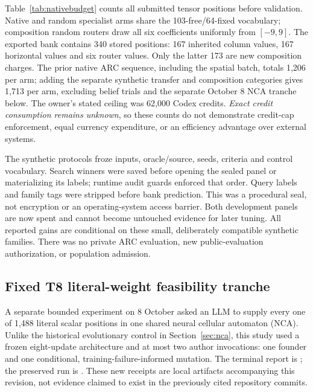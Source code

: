 \documentclass[11pt]{article}
\begin{document}
Table~\ref{tab:nativebudget} counts all submitted tensor positions before validation. Native and
random specialist arms share the 103-free/64-fixed vocabulary; composition random routers draw
all six coefficients uniformly from $[-9,9]$. The exported bank contains 340 stored positions:
167 inherited column values, 167 horizontal values and six router values. Only the latter 173
are new composition charges. The prior native ARC sequence, including the spatial batch, totals
1{,}206 per arm; adding the separate synthetic transfer and composition categories gives 1{,}713
per arm, excluding belief trials and the separate October 8 NCA tranche below. The owner's stated
ceiling was 62{,}000 Codex credits.
\emph{Exact credit consumption remains unknown}, so these counts do not demonstrate credit-cap
enforcement, equal currency expenditure, or an efficiency advantage over external systems.

The synthetic protocols froze inputs, oracle/source, seeds, criteria and control vocabulary.
Search winners were saved before opening the sealed panel or materializing its labels; runtime
audit guards enforced that order. Query labels and family tags were stripped before bank
prediction. This was a procedural seal, not encryption or an operating-system access barrier.
Both development panels are now spent and cannot become untouched evidence for later tuning.
All reported gains are conditional on these small, deliberately compatible synthetic families.
There was no private ARC evaluation, new public-evaluation authorization, or population admission.

\subsection{Fixed T8 literal-weight feasibility tranche}\label{sec:ncatranche}
A separate bounded experiment on 8 October asked an LLM to supply every one of
1{,}488 literal scalar positions in one shared neural cellular automaton (NCA).
Unlike the historical evolutionary control in Section~\ref{sec:nca}, this study
used a frozen eight-update architecture and at most two author invocations: one
founder and one conditional, training-failure-informed mutation. The terminal
report is ; the preserved run is
. These new receipts are local
artifacts accompanying this revision, not evidence claimed to exist in the
previously cited repository commits.
\end{document}
